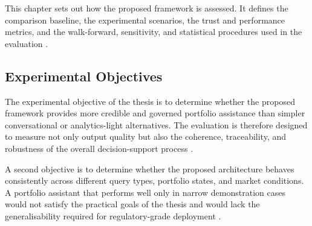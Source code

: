 \documentclass[11pt]{article}
\begin{document}
This chapter sets out how the proposed framework is assessed. It defines the comparison baseline, the experimental scenarios, the trust and performance metrics, and the walk-forward, sensitivity, and statistical procedures used in the evaluation \cite{white2000,lo2002,arrieta2020}.

\begingroup
\setlength{\fboxsep}{10pt}%
\noindent{}%
\endgroup

\subsection{Experimental Objectives}
The experimental objective of the thesis is to determine whether the proposed framework provides more credible and governed portfolio assistance than simpler conversational or analytics-light alternatives. The evaluation is therefore designed to measure not only output quality but also the coherence, traceability, and robustness of the overall decision-support process \cite{wooldridge2009,holzinger2016}.

A second objective is to determine whether the proposed architecture behaves consistently across different query types, portfolio states, and market conditions. A portfolio assistant that performs well only in narrow demonstration cases would not satisfy the practical goals of the thesis and would lack the generalisability required for regulatory-grade deployment \cite{white2000,ji2023}.
\end{document}
